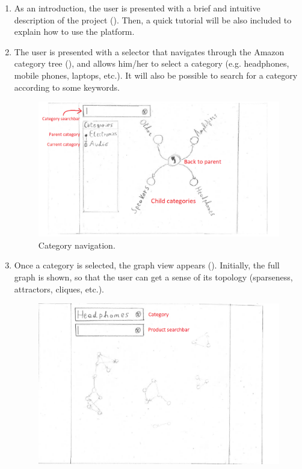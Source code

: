 \documentclass[a4paper,12pt]{article}
\begin{document}
\begin{enumerate}
	\item As an introduction, the user is presented with a brief and intuitive description of the project (). Then, a quick tutorial will be also included to explain how to use the platform.
	\item The user is presented with a selector that navigates through the Amazon category tree (), and allows him/her to select a category (e.g. headphones, mobile phones, laptops, etc.). It will also be possible to search for a category according to some keywords.
	\begin{figure}[H]
		\centering{}
		\includegraphics[width=\textwidth]{img/categories.png}
		\caption{Category navigation.}
		\label{fig:category}
	\end{figure}
	\item Once a category is selected, the graph view appears (). Initially, the full graph is shown, so that the user can get a sense of its topology (sparseness, attractors, cliques, etc.).
		\begin{figure}[H]
		\centering{}
		\includegraphics[width=\textwidth]{img/graph.png}

\end{figure}
\end{enumerate}
\end{document}

